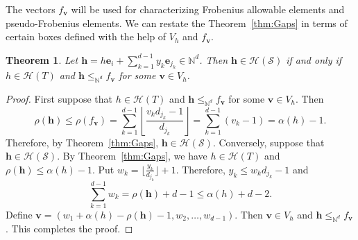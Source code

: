 \documentclass[12pt]{amsart}
\theoremstyle{plain}
\theoremstyle{theorem}
\newtheorem{theorem}[definition]{Theorem}
\theoremstyle{remark}
\begin{document}
The vectors $f_{\mathbf{v}}$ will be used for characterizing Frobenius allowable elements and pseudo-Frobenius elements. We can restate the Theorem~\ref{thm:Gaps} in terms of certain boxes defined with the help of $V_h$ and $f_{\mathbf{v}}$.

\begin{theorem}\label{thm:gaps}
Let $\mathbf{h} = h\mathbf{e}_i + \sum_{k=1}^{d-1}y_k \mathbf{e}_{j_k}\in \mathbb{N}^d$. Then $\mathbf{h}\in \mathcal{H}(\mathcal{S})$ if and only if  $h\in \mathcal{H}(T)$ and $\mathbf{h}\leq_{\mathbb{N}^d} f_\mathbf{v}$ for some $\mathbf{v}\in V_h$.
\end{theorem}
\begin{proof}
First suppose that $h\in \mathcal{H}(T)$ and $\mathbf{h}\leq_{\mathbb{N}^d} f_\mathbf{v}$ for some $\mathbf{v}\in V_h$. Then 
$$\rho(\mathbf{h}) \leq \rho(f_\mathbf{v}) = \sum_{k = 1}^{d-1} \left\lfloor \frac{v_k d_{j_k}-1}{d_{j_k}} \right\rfloor = \sum_{k = 1}^{d-1} (v_k-1) = \alpha(h)-1.$$
Therefore, by Theorem~\ref{thm:Gaps}, $\mathbf{h}\in \mathcal{H}(\mathcal{S})$. Conversely, suppose that $\mathbf{h}\in \mathcal{H}(\mathcal{S})$. By Theorem~\ref{thm:Gaps}, we have $h \in \mathcal{H}(T)$ and $\rho(\mathbf{h}) \leq \alpha(h) - 1$. Put $w_k = \lfloor \frac{y_{k}}{d_{j_k}} \rfloor + 1$. Therefore, $y_{k} \leq w_kd_{j_k} - 1$ and 
$$\sum_{k=1}^{d-1} w_k = \rho(\mathbf{h}) + d -1 \leq \alpha(h) + d -2.$$
Define $\mathbf{v} = (w_1+\alpha(h)-\rho(\mathbf{h})-1,w_2,\ldots, w_{d-1})$. Then $\mathbf{v}\in V_h$ and $\mathbf{h}\leq_{\mathbb{N}^d} f_\mathbf{v}$. This completes the proof. 
\end{proof}
\end{document}
